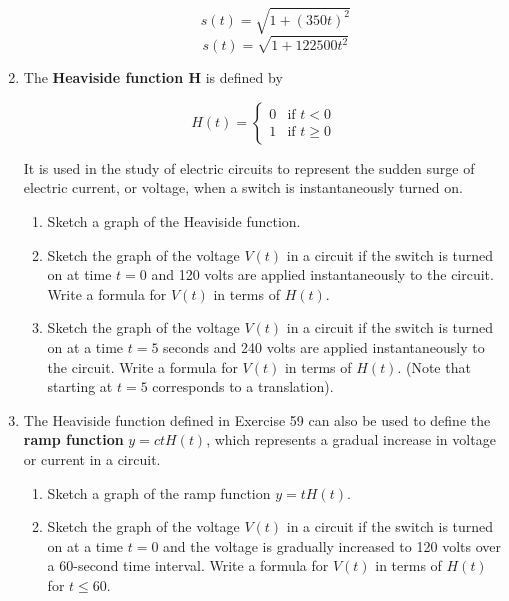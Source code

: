 \documentclass{article}
\begin{document}
\begin{enumerate}
\begin{enumerate}
				$$s(t) = \sqrt{1 + (350t)^2}$$
				$$s(t) = \sqrt{1 + 122500t^2}$$
		\end{enumerate}
		
		\item The \textbf{Heaviside function H} is defined by
		
\begin{displaymath}
   H(t) = \left\{
     \begin{array}{lr}
       0 & \text{if } t < 0\\
       1 &  \text{if } t \geq 0
     \end{array}
   \right.
\end{displaymath} 

		It is used in the study of electric circuits to represent the sudden surge of electric current, or voltage, when
		a switch is instantaneously turned on.
		
		\begin{enumerate}
		
			\item Sketch a graph of the Heaviside function.
			
			\item Sketch the graph of the voltage $V(t)$ in a circuit if the switch is turned on at time $t = 0$ and 
				120 volts are applied instantaneously to the circuit. Write a formula for $V(t)$ in terms of $H(t)$.
				
			\item Sketch the graph of the voltage $V(t)$ in a circuit if the switch is turned on at a time $t = 5$ seconds
				and 240 volts are applied instantaneously to the circuit. Write a formula for $V(t)$ in terms of $H(t)$.
				(Note that starting at $t = 5$ corresponds to a translation).
		\end{enumerate}
		
		\item The Heaviside function defined in Exercise 59 can also be used to define the \textbf{ramp function} $y = ctH(t)$,
			which represents a gradual increase in voltage or current in a circuit.
			
		\begin{enumerate}
		
			\item Sketch a graph of the ramp function $y = tH(t)$.
			
			\item Sketch the graph of the voltage $V(t)$ in a circuit if the switch is turned on at a time $t = 0$ and the
				voltage is gradually increased to 120 volts over a 60-second time interval. Write a formula for
				$V(t)$ in terms of $H(t)$ for $t \leq 60$.
				

\end{enumerate}
\end{enumerate}
\end{document}
